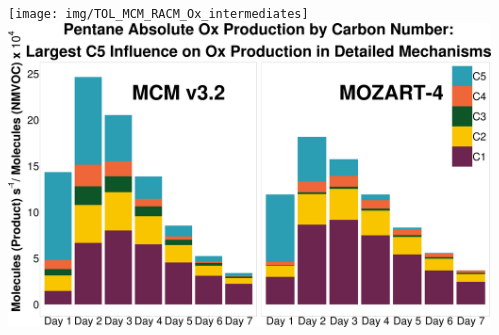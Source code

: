 \begin{GreyBox}
\begin{block}{}
\begin{columns}[c]
\begin{center}
                \end{center}
                \begin{center} 
                    \vskip-1cm
                    \texttt{[image: img/TOL\_MCM\_RACM\_Ox\_intermediates]} 
                    \vskip4cm
                    \includegraphics[scale=0.14]{img/pentane_carbon_breakdown}
                \end{center}
        \end{columns}
%
%
    \end{block}
\end{GreyBox}
